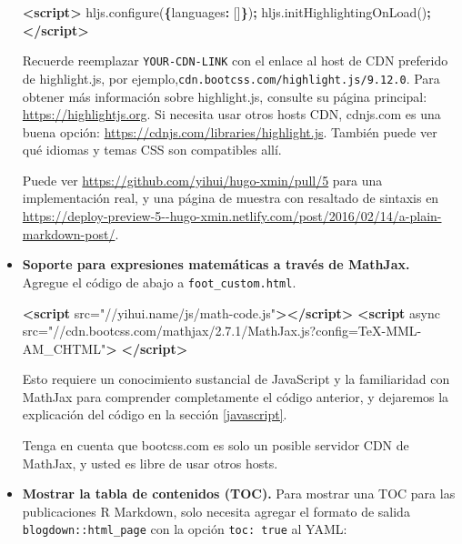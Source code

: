 \documentclass[12pt,]{krantz}
\makeatletter
\newenvironment{Shaded}{\begin{snugshade}}{\end{snugshade}}
\newcommand{\AttributeTok}[1]{\textcolor[rgb]{0.77,0.63,0.00}{#1}}
\newcommand{\DataTypeTok}[1]{\textcolor[rgb]{0.13,0.29,0.53}{#1}}
\newcommand{\KeywordTok}[1]{\textcolor[rgb]{0.13,0.29,0.53}{\textbf{#1}}}
\newcommand{\NormalTok}[1]{#1}
\newcommand{\OperatorTok}[1]{\textcolor[rgb]{0.81,0.36,0.00}{\textbf{#1}}}
\newcommand{\OtherTok}[1]{\textcolor[rgb]{0.56,0.35,0.01}{#1}}
\newcommand{\StringTok}[1]{\textcolor[rgb]{0.31,0.60,0.02}{#1}}
\newcommand{\VariableTok}[1]{\textcolor[rgb]{0.00,0.00,0.00}{#1}}
\newenvironment{kframe}{%
\medskip{}
\setlength{\fboxsep}{.8em}
 \def\at@end@of@kframe{}%
 \ifinner\ifhmode%
  \def\at@end@of@kframe{\end{minipage}}%
  \begin{minipage}{\columnwidth}%
 \fi\fi%
 \def\FrameCommand##1{\hskip\@totalleftmargin \hskip-\fboxsep
 \colorbox{shadecolor}{##1}\hskip-\fboxsep
     \hskip-\linewidth \hskip-\@totalleftmargin \hskip\columnwidth}%
 \MakeFramed {\advance\hsize-\width
   \@totalleftmargin\z@ \linewidth\hsize
   \@setminipage}}%
 {\par\unskip\endMakeFramed%
 \at@end@of@kframe}
\renewenvironment{Shaded}{\begin{kframe}}{\end{kframe}}
\theoremstyle{definition}
\theoremstyle{definition}
\theoremstyle{definition}
\theoremstyle{remark}
\makeatother
\begin{document}
\begin{itemize}
\begin{Shaded}
\begin{Highlighting}[]
\KeywordTok{<script>}
\VariableTok{hljs}\NormalTok{.}\AttributeTok{configure}\NormalTok{(}\OperatorTok{\{}\DataTypeTok{languages}\OperatorTok{:}\NormalTok{ []}\OperatorTok{\}}\NormalTok{)}\OperatorTok{;}
\VariableTok{hljs}\NormalTok{.}\AttributeTok{initHighlightingOnLoad}\NormalTok{()}\OperatorTok{;}
\KeywordTok{</script>}
\end{Highlighting}
\end{Shaded}

  Recuerde reemplazar \texttt{YOUR-CDN-LINK} con el enlace al host de
  CDN preferido de highlight.js, por
  ejemplo,\texttt{cdn.bootcss.com/highlight.js/9.12.0}. Para obtener más
  información sobre highlight.js, consulte su página principal:
  \url{https://highlightjs.org}. Si necesita usar otros hosts CDN,
  cdnjs.com es una buena opción:
  \url{https://cdnjs.com/libraries/highlight.js}. También puede ver qué
  idiomas y temas CSS son compatibles allí.

  Puede ver \url{https://github.com/yihui/hugo-xmin/pull/5} para una
  implementación real, y una página de muestra con resaltado de sintaxis
  en
  \url{https://deploy-preview-5--hugo-xmin.netlify.com/post/2016/02/14/a-plain-markdown-post/}.
\item
  \textbf{Soporte para expresiones matemáticas a través de MathJax.}
  Agregue el código de abajo a
  \texttt{foot\_custom.html}.

\begin{Shaded}
\begin{Highlighting}[]
\KeywordTok{<script}\OtherTok{ src=}\StringTok{"//yihui.name/js/math-code.js"}\KeywordTok{></script>}
\KeywordTok{<script}\OtherTok{ async}
\OtherTok{src=}\StringTok{"//cdn.bootcss.com/mathjax/2.7.1/MathJax.js?config=TeX-MML-AM_CHTML"}\KeywordTok{>}
\KeywordTok{</script>}
\end{Highlighting}
\end{Shaded}

  Esto requiere un conocimiento sustancial de JavaScript y la
  familiaridad con MathJax para comprender completamente el código
  anterior, y dejaremos la explicación del código en la sección
  \ref{javascript}.

  Tenga en cuenta que bootcss.com es solo un posible servidor CDN de
  MathJax, y usted es libre de usar otros hosts.
\item
  \textbf{Mostrar la tabla de contenidos (TOC).} Para mostrar una
  TOC para las publicaciones R Markdown, solo
  necesita agregar el formato de salida \texttt{blogdown::html\_page}
  con la opción \texttt{toc:\ true} al YAML:


\end{itemize}
\end{document}
